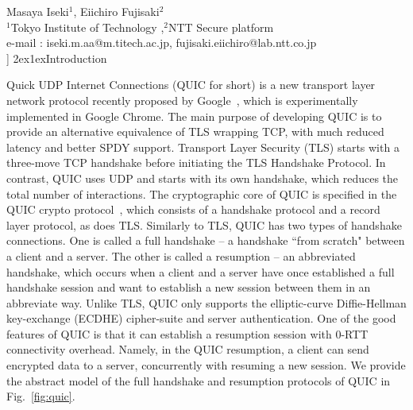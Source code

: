 \documentclass[11pt,a4j]{jarticle}
\makeatletter
\renewcommand{\baselinestretch}{1.3}\selectfont
\def\Title#1{{\Large\bf#1}\\[6pt]}
\def\Author#1{{\normalsize\hspace*{2zw}#1}\\[-4pt]}
\def\Affiliation#1{{\normalsize\hspace*{2zw}#1}\\[-5pt]}
\def\Email#1{\hspace*{2zw}e-mail : #1\\[0pt]}
\renewcommand{\section}{\@startsection{section}{1}{\z@}%
{2ex}{1ex}{\reset@font\large\bfseries}}%
\makeatother
\begin{document}
\twocolumn[
%
\Title{On the security of QUIC}
\Author{Masaya Iseki$^{1}$, Eiichiro Fujisaki$^{2}$}
\Affiliation{$^{1}$Tokyo Institute of Technology ,$^{2}$NTT Secure platform}
\Email{iseki.m.aa@m.titech.ac.jp, fujisaki.eiichiro@lab.ntt.co.jp}
%
]
\renewcommand{\baselinestretch}{0.95}\selectfont
%
%
\section{Introduction}

Quick UDP Internet Connections (QUIC for short)
is a new transport layer network protocol recently proposed by Google~\cite{QUIC},
which is experimentally implemented in Google Chrome.
The main purpose of developing QUIC is to provide an alternative equivalence of TLS wrapping TCP,
with much reduced latency and better SPDY support.
Transport Layer Security (TLS) starts with a three-move TCP handshake
before initiating the TLS Handshake Protocol.
In contrast, QUIC uses UDP and starts with its own handshake,
which reduces the total number of interactions.
The cryptographic core of QUIC is specified in the QUIC crypto protocol~\cite{QUIC:Crypto},
which consists of a handshake protocol and a record layer protocol,
as does TLS.
Similarly to TLS, QUIC has two types of handshake connections.
One is called a full handshake --
a handshake ``from scratch" between a client and a server.
The other is called a resumption -- an abbreviated handshake,
which occurs when a client and a server have once established a full handshake session
and want to establish a new session between them in an abbreviate way.
Unlike TLS,
QUIC only supports the elliptic-curve Diffie-Hellman key-exchange (ECDHE) cipher-suite and server authentication.
%
One of the good features of QUIC is that it can establish a resumption session
with $0$-RTT connectivity overhead.
Namely, in the QUIC resumption, a client can
send encrypted data to a server, concurrently with resuming a new session.
We provide the abstract model of the full handshake and resumption protocols of QUIC
in Fig.~\ref{fig:quic}.
\end{document}
